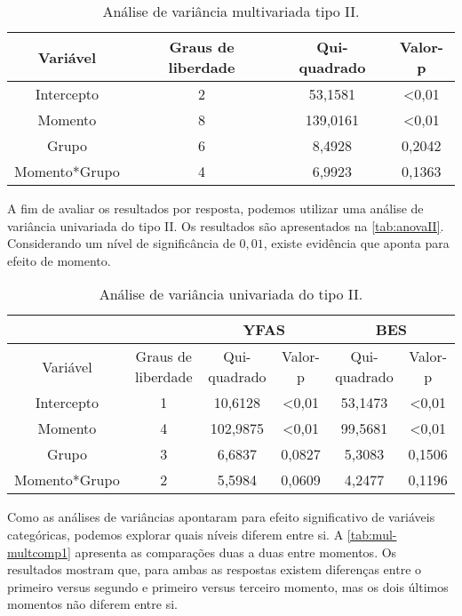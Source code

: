 \begin{table}[H]
\centering
\begin{tabular}{cccc}
\hline
Variável      & Graus de liberdade & Qui-quadrado & Valor-p        \\ \hline
Intercepto    & 2                  & 53,1581      & \textless 0,01 \\
Momento       & 8                  & 139,0161     & \textless 0,01 \\
Grupo         & 6                  & 8,4928       & 0,2042         \\
Momento*Grupo & 4                  & 6,9923       & 0,1363         \\ \hline
\end{tabular}
\caption{Análise de variância multivariada tipo II.}
\label{tab:manovaII}
\end{table}

A fim de avaliar os resultados por resposta, podemos utilizar uma análise de variância univariada do tipo II. Os resultados são apresentados na \autoref{tab:anovaII}. Considerando um nível de significância de $0,01$, existe evidência que aponta para efeito de momento.

\begin{table}[H]
\centering
\begin{tabular}{c|c|cc|cc}
\hline
              &                    & \multicolumn{2}{c|}{YFAS}     & \multicolumn{2}{c}{BES}       \\ \hline
Variável      & Graus de liberdade & Qui-quadrado & Valor-p        & Qui-quadrado & Valor-p        \\ \hline
Intercepto    & 1                  & 10,6128      & \textless 0,01 & 53,1473      & \textless 0,01 \\
Momento       & 4                  & 102,9875     & \textless 0,01 & 99,5681      & \textless 0,01 \\
Grupo         & 3                  & 6,6837       & 0,0827         & 5,3083       & 0,1506         \\
Momento*Grupo & 2                  & 5,5984       & 0,0609         & 4,2477       & 0,1196         \\ \hline
\end{tabular}
\caption{Análise de variância univariada do tipo II.}
\label{tab:anovaII}
\end{table}

Como as análises de variâncias apontaram para efeito significativo de variáveis categóricas, podemos explorar quais níveis diferem entre si. A \autoref{tab:mul-multcomp1} apresenta as comparações duas a duas entre momentos. Os resultados mostram que, para ambas as respostas existem diferenças entre o primeiro versus segundo e primeiro versus terceiro momento, mas os dois últimos momentos não diferem entre si.


